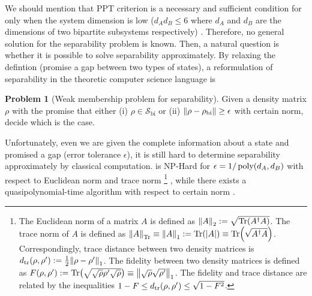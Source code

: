 \documentclass[
aps,
pra,
twocolumn,
floatfix,
]{revtex4-2}
\theoremstyle{plain}
\theoremstyle{definition}
\newtheorem{problem}{Problem}
\newcommand{\dm}{\rho}
\newcommand{\bi}{\text{bi}}
\newcommand{\separableset}{\mathcal{S}}
\begin{document}
We should mention that PPT criterion is a necessary and sufficient condition for  only when the system dimension is low ($d_A d_B \le 6$ where $d_A$ and $d_B$ are the dimensions of two bipartite subsystems respectively) \cite{horodeckiSeparabilityMixedStates1996}.
Therefore, no general solution for the separability problem is known.
Then, a natural question is whether it is possible to solve separability approximately.
By relaxing the defintion (promise a gap between two types of states), a reformulation of separability in the theoretic computer science language is
\begin{problem}[Weak membership problem for separability]\label{prm:weak_membership problem_for_separability}
	Given a density matrix $\dm$ with the promise that either (i) $\dm\in \separableset_{\bi}$ or (ii) $\norm{\dm-\dm_{\bi}}\ge \epsilon$ with certain norm, decide which is the case.
\end{problem}
Unfortunately, even we are given the complete information about a state and promised a gap (error tolerance $\epsilon$), it is still hard to determine separability approximately by classical computation.
 is NP-Hard for $\epsilon=1/\operatorname{\textup{poly}}(d_A,d_B)$ with respect to Euclidean norm and trace norm \footnote{
	The Euclidean norm of a matrix $A$ is defined as $\norm{A}_2:=\sqrt{\Tr(A^\dagger A)}$.
	The trace norm of $A$ is defined as $\norm{A}_{\Tr}\equiv\norm{A}_{1}:=\Tr(\abs{A})\equiv\Tr(\sqrt{A^\dagger A})$.
	Correspondingly, trace distance between two density matrices is $d_{\tr}(\dm,\dm') : = \frac{1}{2} \norm{\dm-\dm'}_1$.
	The fidelity between two density matrices is defined as $F(\dm,\dm') : = \Tr(\sqrt{\sqrt{\dm}\dm'\sqrt{\dm}})\equiv\norm{\sqrt{\dm}\sqrt{\dm'}}_1$.
	The fidelity and trace distance are related by the inequalities
	$1-F\le d_{\tr}(\dm,\dm') \le \sqrt{1-F^2}$.
} \cite{gurvitsClassicalDeterministicComplexity2003} \cite{gharibianStrongNPHardnessQuantum2009},
while there exists a quasipolynomial-time algorithm with respect to certain norm \cite{brandaoQuasipolynomialtimeAlgorithmQuantum2011}.
\end{document}
